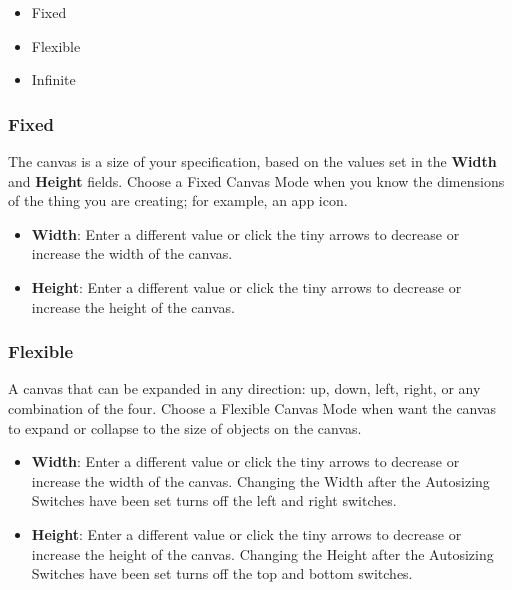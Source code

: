 \documentclass[../main.tex]{subfiles}
\begin{document}
\begin{itemize}
  \item Fixed
  \item Flexible
  \item Infinite
\end{itemize}

\subsubsection{Fixed}

The canvas is a size of your specification, based on the values set in the \textbf{Width} and
\textbf{Height} fields. Choose a Fixed Canvas Mode when you know the dimensions of the thing
you are creating; for example, an app icon.


\begin{itemize}
  \item \textbf{Width}: Enter a different value or click the tiny arrows to decrease or increase
    the width of the canvas.
  \item \textbf{Height}: Enter a different value or click the tiny arrows to decrease or
    increase the height of the canvas.
\end{itemize}

\subsubsection{Flexible}

A canvas that can be expanded in any direction: up, down, left, right, or any combination of the
four. Choose a Flexible Canvas Mode when want the canvas to expand or collapse to the size of
objects on the canvas.


\begin{itemize}
  \item \textbf{Width}: Enter a different value or click the tiny arrows to decrease or increase
    the width of the canvas. Changing the Width after the Autosizing Switches have been set
    turns off the left and right switches.
  \item \textbf{Height}: Enter a different value or click the tiny arrows to decrease or
    increase the height of the canvas. Changing the Height after the Autosizing Switches have
    been set turns off the top and bottom switches.
\end{itemize}
\end{document}
